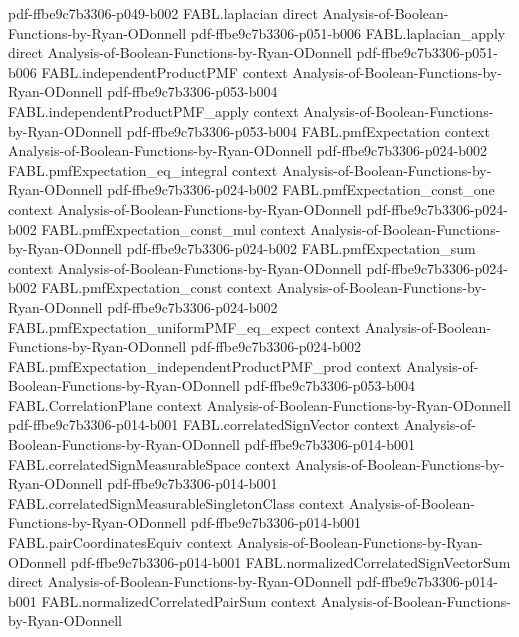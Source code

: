 \begin{theorem}
  {pdf-ffbe9c7b3306-p049-b002}
\proofstep
  {FABL.laplacian}
  {direct}
  {Analysis-of-Boolean-Functions-by-Ryan-ODonnell}
  {pdf-ffbe9c7b3306-p051-b006}
\proofstep
  {FABL.laplacian_apply}
  {direct}
  {Analysis-of-Boolean-Functions-by-Ryan-ODonnell}
  {pdf-ffbe9c7b3306-p051-b006}
\proofstep
  {FABL.independentProductPMF}
  {context}
  {Analysis-of-Boolean-Functions-by-Ryan-ODonnell}
  {pdf-ffbe9c7b3306-p053-b004}
\proofstep
  {FABL.independentProductPMF_apply}
  {context}
  {Analysis-of-Boolean-Functions-by-Ryan-ODonnell}
  {pdf-ffbe9c7b3306-p053-b004}
\proofstep
  {FABL.pmfExpectation}
  {context}
  {Analysis-of-Boolean-Functions-by-Ryan-ODonnell}
  {pdf-ffbe9c7b3306-p024-b002}
\proofstep
  {FABL.pmfExpectation_eq_integral}
  {context}
  {Analysis-of-Boolean-Functions-by-Ryan-ODonnell}
  {pdf-ffbe9c7b3306-p024-b002}
\proofstep
  {FABL.pmfExpectation_const_one}
  {context}
  {Analysis-of-Boolean-Functions-by-Ryan-ODonnell}
  {pdf-ffbe9c7b3306-p024-b002}
\proofstep
  {FABL.pmfExpectation_const_mul}
  {context}
  {Analysis-of-Boolean-Functions-by-Ryan-ODonnell}
  {pdf-ffbe9c7b3306-p024-b002}
\proofstep
  {FABL.pmfExpectation_sum}
  {context}
  {Analysis-of-Boolean-Functions-by-Ryan-ODonnell}
  {pdf-ffbe9c7b3306-p024-b002}
\proofstep
  {FABL.pmfExpectation_const}
  {context}
  {Analysis-of-Boolean-Functions-by-Ryan-ODonnell}
  {pdf-ffbe9c7b3306-p024-b002}
\proofstep
  {FABL.pmfExpectation_uniformPMF_eq_expect}
  {context}
  {Analysis-of-Boolean-Functions-by-Ryan-ODonnell}
  {pdf-ffbe9c7b3306-p024-b002}
\proofstep
  {FABL.pmfExpectation_independentProductPMF_prod}
  {context}
  {Analysis-of-Boolean-Functions-by-Ryan-ODonnell}
  {pdf-ffbe9c7b3306-p053-b004}
\proofstep
  {FABL.CorrelationPlane}
  {context}
  {Analysis-of-Boolean-Functions-by-Ryan-ODonnell}
  {pdf-ffbe9c7b3306-p014-b001}
\proofstep
  {FABL.correlatedSignVector}
  {context}
  {Analysis-of-Boolean-Functions-by-Ryan-ODonnell}
  {pdf-ffbe9c7b3306-p014-b001}
\proofstep
  {FABL.correlatedSignMeasurableSpace}
  {context}
  {Analysis-of-Boolean-Functions-by-Ryan-ODonnell}
  {pdf-ffbe9c7b3306-p014-b001}
\proofstep
  {FABL.correlatedSignMeasurableSingletonClass}
  {context}
  {Analysis-of-Boolean-Functions-by-Ryan-ODonnell}
  {pdf-ffbe9c7b3306-p014-b001}
\proofstep
  {FABL.pairCoordinatesEquiv}
  {context}
  {Analysis-of-Boolean-Functions-by-Ryan-ODonnell}
  {pdf-ffbe9c7b3306-p014-b001}
\proofstep
  {FABL.normalizedCorrelatedSignVectorSum}
  {direct}
  {Analysis-of-Boolean-Functions-by-Ryan-ODonnell}
  {pdf-ffbe9c7b3306-p014-b001}
\proofstep
  {FABL.normalizedCorrelatedPairSum}
  {context}
  {Analysis-of-Boolean-Functions-by-Ryan-ODonnell}

\end{theorem}
